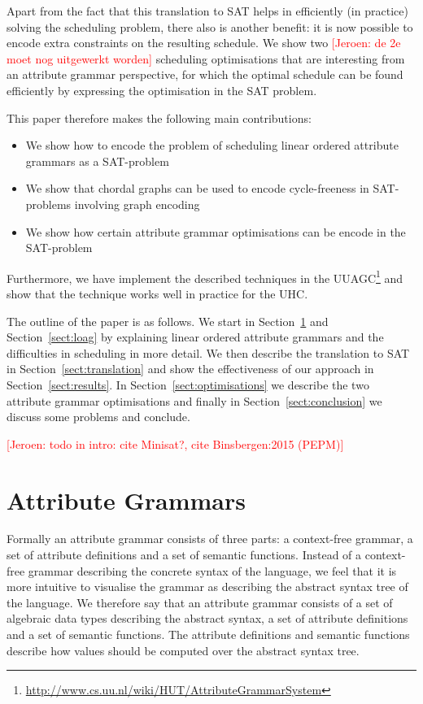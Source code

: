 \documentclass{llncs}
\newif\iffinal\finalfalse
\newcommand{\REM}[3]{\iffinal\else\textcolor{#2}{[#1: #3]}\fi}
\newcommand{\Jeroen}[1]{\REM{Jeroen}{red}{#1}}
\newcommand{\sectref}[1]{Section~\ref{#1}}
\begin{document}
Apart from the fact that this translation to SAT helps in efficiently (in practice) solving the scheduling problem, there also is another benefit: it is now possible to encode extra constraints on the resulting schedule. We show two \Jeroen{de 2e moet nog uitgewerkt worden} scheduling optimisations that are interesting from an attribute grammar perspective, for which the optimal schedule can be found efficiently by expressing the optimisation in the SAT problem.

This paper therefore makes the following main contributions:
\begin{itemize}
\item We show how to encode the problem of scheduling linear ordered attribute grammars as a SAT-problem
\item We show that chordal graphs can be used to encode cycle-freeness in SAT-problems involving graph encoding
\item We show how certain attribute grammar optimisations can be encode in the SAT-problem
\end{itemize}
Furthermore, we have implement the described techniques in the UUAGC\footnote{\url{http://www.cs.uu.nl/wiki/HUT/AttributeGrammarSystem}} \cite{combinator-languages} and show that the technique works well in practice for the UHC.

The outline of the paper is as follows. We start in \sectref{sect:ag} and \sectref{sect:loag} by explaining linear ordered attribute grammars and the difficulties in scheduling in more detail. We then describe the translation to SAT in \sectref{sect:translation} and show the effectiveness of our approach in \sectref{sect:results}. In \sectref{sect:optimisations} we describe the two attribute grammar optimisations and finally in \sectref{sect:conclusion} we discuss some problems and conclude.

\Jeroen{todo in intro: cite Minisat?, cite Binsbergen:2015 (PEPM)}


\section{Attribute Grammars} \label{sect:ag}
Formally an attribute grammar consists of three parts: a context-free grammar, a set of attribute definitions and a set of semantic functions. Instead of a context-free grammar describing the concrete syntax of the language, we feel that it is more intuitive to visualise the grammar as describing the abstract syntax tree of the language. We therefore say that an attribute grammar consists of a set of algebraic data types describing the abstract syntax, a set of attribute definitions and a set of semantic functions. The attribute definitions and semantic functions describe how values should be computed over the abstract syntax tree.
\end{document}
